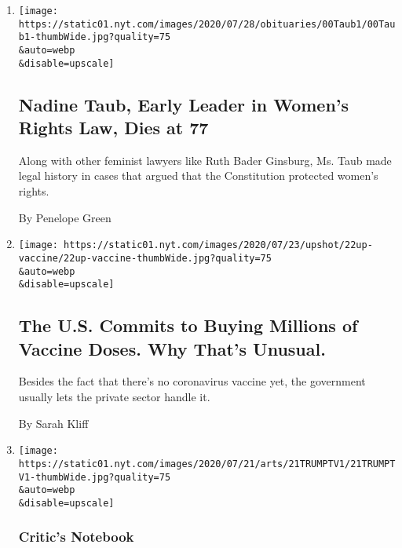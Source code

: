 \begin{enumerate}
\def\labelenumi{\arabic{enumi}.}
\item
  \href{/2020/07/24/us/nadine-taub-feminist-lawyer-dead.html}{}

  \texttt{[image: https://static01.nyt.com/images/2020/07/28/obituaries/00Taub1/00Taub1-thumbWide.jpg?quality=75\\\&auto=webp\\\&disable=upscale]}

  \hypertarget{nadine-taub-early-leader-in-womens-rights-law-dies-at-77}{%
  \subsection{Nadine Taub, Early Leader in Women's Rights Law, Dies at
  77}\label{nadine-taub-early-leader-in-womens-rights-law-dies-at-77}}

  Along with other feminist lawyers like Ruth Bader Ginsburg, Ms. Taub
  made legal history in cases that argued that the Constitution
  protected women's rights.

  By Penelope Green
\item
  \href{/2020/07/22/upshot/vaccine-coronavirus-government-purchase.html}{}

  \texttt{[image: https://static01.nyt.com/images/2020/07/23/upshot/22up-vaccine/22up-vaccine-thumbWide.jpg?quality=75\\\&auto=webp\\\&disable=upscale]}

  \hypertarget{the-us-commits-to-buying-millions-of-vaccine-doses-why-thats-unusual}{%
  \subsection{The U.S. Commits to Buying Millions of Vaccine Doses. Why
  That's
  Unusual.}\label{the-us-commits-to-buying-millions-of-vaccine-doses-why-thats-unusual}}

  Besides the fact that there's no coronavirus vaccine yet, the
  government usually lets the private sector handle it.

  By Sarah Kliff
\item
  \href{/2020/07/21/arts/television/trump-briefings.html}{}

  \texttt{[image: https://static01.nyt.com/images/2020/07/21/arts/21TRUMPTV1/21TRUMPTV1-thumbWide.jpg?quality=75\\\&auto=webp\\\&disable=upscale]}

  \hypertarget{critics-notebook}{%
  \subsubsection{Critic's Notebook}\label{critics-notebook}}


\end{enumerate}
